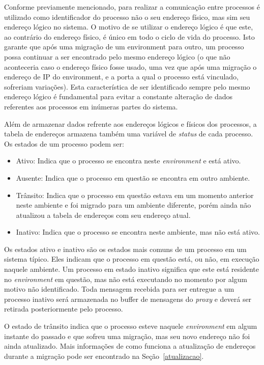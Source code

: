 Conforme previamente mencionado, para realizar a comunicação entre processos é utilizado como identificador do processo não o seu endereço físico, mas sim seu endereço lógico no sistema. O motivo de se utilizar o endereço lógico é que este, ao contrário do endereço físico, é único em todo o ciclo de vida do processo. Isto garante que após uma migração de um environment para outro, um processo possa continuar a ser encontrado pelo mesmo endereço lógico (o que não aconteceria caso o endereço físico fosse usado, uma vez que após uma migração o endereço de IP do environment, e a porta a qual o processo está vinculado, sofreriam variações). Esta característica de ser identificado sempre pelo mesmo endereço lógico é fundamental para evitar a constante alteração de dados referentes aos processos em inúmeras partes do sistema.

Além de armazenar dados refrente aos endereços lógicos e físicos dos processos, a tabela de endereços armazena também uma variável de \textit{status} de cada processo. Os estados de um processo podem ser:

\begin{itemize}
\item Ativo: Indica que o processo se encontra neste \textit{environment} e está ativo. 
\item Ausente: Indica que o processo em questão se encontra em outro ambiente.
\item Trânsito: Indica que o processo em questão estava em um momento anterior neste ambiente e foi migrado para um ambiente diferente, porém ainda não atualizou a tabela de endereços com seu endereço atual.
\item Inativo: Indica que o processo se encontra neste ambiente, mas não está ativo.
\end{itemize}

Os estados ativo e inativo são os estados mais comuns de um processo em um sistema típico. Eles indicam que o processo em questão está, ou não, em execução naquele ambiente. Um processo em estado inativo significa que este está residente no \textit{environment} em questão, mas não está executando no momento por algum motivo não identificado. Toda mensagem recebida para ser entregue a um processo inativo será armazenada no buffer de mensagens do \textit{proxy} e deverá ser retirada posteriormente pelo processo.

O estado de trânsito indica que o processo esteve naquele \textit{environment} em algum instante do passado e que sofreu uma migração, mas seu novo endereço não foi ainda atualizado. Mais informações de como funciona a atualização de endereços durante a migração pode ser encontrado na Seção~\ref{atualizacao}.

